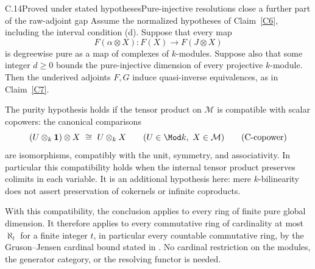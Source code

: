 \begin{claim}{C.14}{Proved under stated hypotheses}{Pure-injective resolutions close a further part of the raw-adjoint gap}\label{C14}
Assume the normalized hypotheses of Claim~\ref{C6}, including the interval condition (d). Suppose that every map
\[
 F(\alpha\otimes X):F(X)\longrightarrow F(J\otimes X)
\]
is degreewise pure as a map of complexes of $k$-modules. Suppose also that some integer $d\geq0$ bounds the pure-injective dimension of every projective $k$-module. Then the underived adjoints $F,G$ induce quasi-inverse equivalences, as in Claim~\ref{C7}.

The purity hypothesis holds if the tensor product on $\mathcal M$ is compatible with scalar copowers: the canonical comparisons
\[
 (U\otimes_k\mathbf1)\otimes X\ \cong\ U\otimes_kX
 \qquad(U\in\Mod k,\ X\in\mathcal M)
 \tag{C-copower}\label{Ccopower}
\]
are isomorphisms, compatibly with the unit, symmetry, and associativity. In particular this compatibility holds when the internal tensor product preserves colimits in each variable. It is an additional hypothesis here: mere $k$-bilinearity does not assert preservation of cokernels or infinite coproducts.

With this compatibility, the conclusion applies to every ring of finite pure global dimension. It therefore applies to every commutative ring of cardinality at most $\aleph_t$ for a finite integer $t$, in particular every countable commutative ring, by the Gruson--Jensen cardinal bound stated in \citet[Theorem 2.6.3]{BensonGnacadja1999}. No cardinal restriction on the modules, the generator category, or the resolving functor is needed.
\end{claim}
